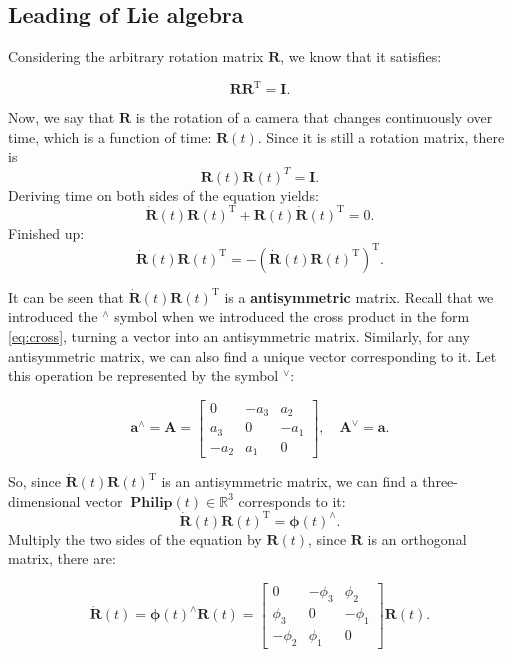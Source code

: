 \subsection{Leading of Lie algebra}
Considering the arbitrary rotation matrix $\bm{R}$, we know that it satisfies:

\begin{equation}
  \bm{R} \bm{R}^\mathrm{T}=\bm{I}.
\end{equation}

Now, we say that $\bm{R}$ is the rotation of a camera that changes continuously over time, which is a function of time: $\bm{R}(t)$. Since it is still a rotation matrix, there is
\[
  \bm{R}(t) \bm{R}(t) ^T = \bm{I}.
\]
Deriving time on both sides of the equation yields:
\[
  \bm{\dot{R}} (t) \bm{R} {(t)^\mathrm{T}} + \bm{R} (t) \bm{\dot{R}} {(t)^\mathrm{T}} = 0.
\]
Finished up:
\begin{equation}
  \bm{\dot{R}} (t) \bm{R} {(t)^\mathrm{T}} = - \left(  \bm{\dot{R}} (t) \bm{R} {(t)^\mathrm{T}} \right)^\mathrm{T} .
\end{equation}

It can be seen that $\bm{\dot{R}} (t) \bm{R} {(t)^\mathrm{T}}$ is a \textbf{antisymmetric} matrix. Recall that we introduced the $^\wedge$ symbol when we introduced the cross product in the form \eqref{eq:cross}, turning a vector into an antisymmetric matrix. Similarly, for any antisymmetric matrix, we can also find a unique vector corresponding to it. Let this operation be represented by the symbol $^{\vee}$:

\begin{equation}
  {\bm{a}^ \wedge } = \bm{A} = \left[ {\begin{array}{*{20}{c}}
        0&{ - {a_3}}&{{a_2}}\\
        {{a_3}}&0&{ - {a_1}}\\
        { - {a_2}}&{{a_1}}&0
  \end{array}} \right], \quad
  { \bm{A}^ \vee } = \bm{a}.
\end{equation}

So, since $\bm{\dot{R}} (t) \bm{R} {(t)^\mathrm{T}}$ is an antisymmetric matrix, we can find a three-dimensional vector $\boldsymbol{\ Philip} (t) \in \mathbb{R}^3$ corresponds to it:
\[
  \bm{ \dot{R} } (t) \bm{R}(t)^\mathrm{T} = \boldsymbol{\phi} (t) ^ {\wedge}.
\]
Multiply the two sides of the equation by $\bm{R}(t)$, since $\bm{R}$ is an orthogonal matrix, there are:

\begin{equation}
\label{eq:dR}
\bm{ \dot{R} } (t)  = \boldsymbol{\phi} (t)^{\wedge} \bm{R}(t) =
\left[ {\begin{array}{*{20}{c}}
  0&{ - {\phi _3}}&{{\phi _2}}\\
  {{\phi _3}}&0&{ - {\phi _1}}\\
  { - {\phi _2}}&{{\phi _1}}&0
\end{array}} \right] \bm{R} (t).
\end{equation}

